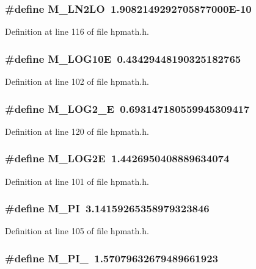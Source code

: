 \subsubsection{\setlength{\rightskip}{0pt plus 5cm}\#define M\_\-LN2LO\ 1.9082149292705877000E-10}\label{hpmath_8h_a26}




Definition at line 116 of file hpmath.h.
\subsubsection{\setlength{\rightskip}{0pt plus 5cm}\#define M\_\-LOG10E\ 0.43429448190325182765}\label{hpmath_8h_a12}




Definition at line 102 of file hpmath.h.
\subsubsection{\setlength{\rightskip}{0pt plus 5cm}\#define M\_\-LOG2\_\-E\ 0.693147180559945309417}\label{hpmath_8h_a30}




Definition at line 120 of file hpmath.h.
\subsubsection{\setlength{\rightskip}{0pt plus 5cm}\#define M\_\-LOG2E\ 1.4426950408889634074}\label{hpmath_8h_a11}




Definition at line 101 of file hpmath.h.
\subsubsection{\setlength{\rightskip}{0pt plus 5cm}\#define M\_\-PI\ 3.14159265358979323846}\label{hpmath_8h_a15}




Definition at line 105 of file hpmath.h.
\subsubsection{\setlength{\rightskip}{0pt plus 5cm}\#define M\_\-PI\_\ 1.57079632679489661923}\label{hpmath_8h_a17}




